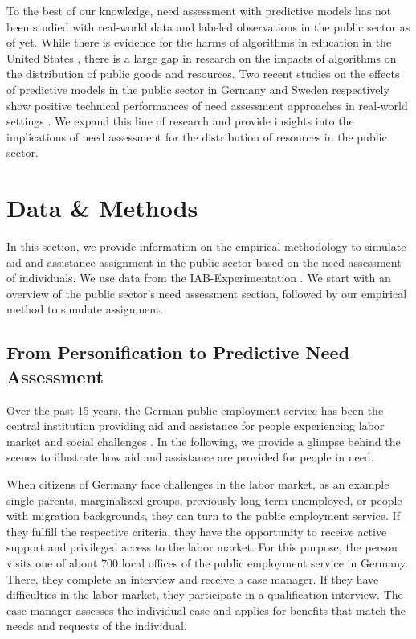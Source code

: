 \documentclass{article} %
\begin{document}
To the best of our knowledge, need assessment with predictive models has not been studied with real-world data and labeled observations in the public sector as of yet. While there is evidence for the harms of algorithms in education in the United States \cite{chouldechova2018case}, there is a large gap in research on the impacts of algorithms on the distribution of public goods and resources. Two recent studies on the effects of predictive models in the public sector in Germany and Sweden respectively show positive technical performances of need assessment approaches in real-world settings \cite{FISCHERABAIGAR2024101976,sun2019mapping}. We expand this line of research and provide insights into the implications of need assessment for the distribution of resources in the public sector.




\section{Data \& Methods}

\label{sec:data}
In this section, we provide information on the empirical methodology to simulate aid and assistance assignment in the public sector based on the need assessment of individuals. We use data from the IAB-Experimentation \cite{athey2021policy}. We start with an overview of the public sector's need assessment section, followed by our empirical method to simulate assignment.

\subsection{From Personification to Predictive Need Assessment}
Over the past 15 years, the German public employment service has been the central institution providing aid and assistance for people experiencing labor market and social challenges \cite{Kallus03042021, wirtz2019artificial}. In the following, we provide a glimpse behind the scenes to illustrate how aid and assistance are provided for people in need.

When citizens of Germany face challenges in the labor market, as an example single parents, marginalized groups, previously long-term unemployed, or people with migration backgrounds, they can turn to the public employment service. If they fulfill the respective criteria, they have the opportunity to receive active support and privileged access to the labor market. For this purpose, the person visits one of about $700$ local offices of the public employment service in Germany. There, they complete an interview and receive a case manager. If they have difficulties in the labor market, they participate in a qualification interview. The case manager assesses the individual case and applies for benefits that match the needs and requests of the individual.
\end{document}
